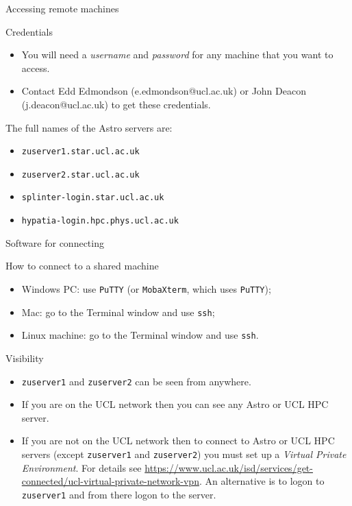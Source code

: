 \documentclass{beamer}
\newcommand{\command}[1]{\colorbox{light-gray}{\texttt{#1}}}
\begin{document}
\begin{frame}{Accessing remote machines}
  \begin{block}{Credentials}
    \begin{itemize}
      \item You will need a \textit{username} and \textit{password} for any machine that you want to access.
      \item Contact Edd Edmondson (e.edmondson@ucl.ac.uk) or John Deacon (j.deacon@ucl.ac.uk) to get these credentials.
    \end{itemize}
  \end{block}
  \begin{block}{The full names of the Astro servers are:}
    \begin{itemize}
      \item \texttt{zuserver1.star.ucl.ac.uk}
      \item \texttt{zuserver2.star.ucl.ac.uk}
      \item \texttt{splinter-login.star.ucl.ac.uk}
      \item \texttt{hypatia-login.hpc.phys.ucl.ac.uk}
    \end{itemize}
  \end{block}
\end{frame}


\begin{frame}{Software for connecting}
  \begin{block}{How to connect to a shared machine}
    \begin{itemize}
      \item Windows PC: use \command{PuTTY} (or \command{MobaXterm}, which uses \command{PuTTY});
      \item Mac: go to the Terminal window and use \command{ssh};
      \item Linux machine: go to the Terminal window and use \command{ssh}.
    \end{itemize}
  \end{block}
\end{frame}

\begin{frame}{Visibility}
  \begin{block}{}
    \begin{itemize}
    \item \texttt{zuserver1} and \texttt{zuserver2} can be seen from anywhere.
    \item If you are on the UCL network then you can see any Astro or UCL HPC server.
    \item If you are not on the UCL network then to connect to Astro or UCL HPC servers (except \texttt{zuserver1} and \texttt{zuserver2}) you must set up a \textit{Virtual Private Environment}. For details see \url{https://www.ucl.ac.uk/isd/services/get-connected/ucl-virtual-private-network-vpn}. An alternative is to logon to \texttt{zuserver1} and from there logon to the server.
    \end{itemize}
  \end{block}
\end{frame}
\end{document}
